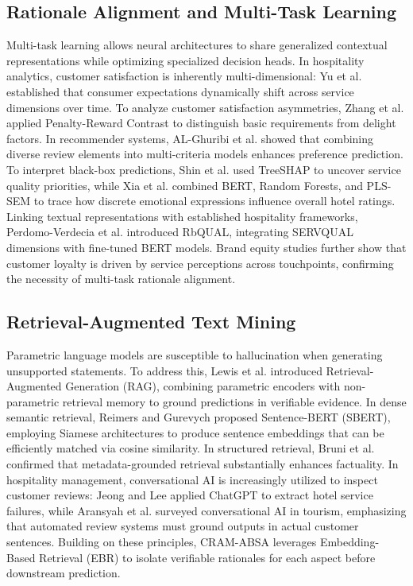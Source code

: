 \documentclass{llncs}
\begin{document}
\subsection{Rationale Alignment and Multi-Task Learning}
\label{subsec:rw_rationale_multitask}
Multi-task learning allows neural architectures to share generalized contextual representations while optimizing specialized decision heads. In hospitality analytics, customer satisfaction is inherently multi-dimensional: Yu et al. \cite{ref06_yu2024} established that consumer expectations dynamically shift across service dimensions over time. To analyze customer satisfaction asymmetries, Zhang et al. \cite{ref13_zhang2022} applied Penalty-Reward Contrast to distinguish basic requirements from delight factors. In recommender systems, AL-Ghuribi et al. \cite{ref27_alghuribi2025} showed that combining diverse review elements into multi-criteria models enhances preference prediction. To interpret black-box predictions, Shin et al. \cite{ref16_shin2024} used TreeSHAP to uncover service quality priorities, while Xia et al. \cite{ref28_xia2026} combined BERT, Random Forests, and PLS-SEM to trace how discrete emotional expressions influence overall hotel ratings. Linking textual representations with established hospitality frameworks, Perdomo-Verdecia et al. \cite{ref17_perdomo2026} introduced RbQUAL, integrating SERVQUAL dimensions with fine-tuned BERT models. Brand equity studies \cite{ref19_tahir2024,ref26_piriyakul2024} further show that customer loyalty is driven by service perceptions across touchpoints, confirming the necessity of multi-task rationale alignment.

\subsection{Retrieval-Augmented Text Mining}
\label{subsec:rw_retrieval_augmented}
Parametric language models are susceptible to hallucination when generating unsupported statements. To address this, Lewis et al. \cite{ref23_lewis2020} introduced Retrieval-Augmented Generation (RAG), combining parametric encoders with non-parametric retrieval memory to ground predictions in verifiable evidence. In dense semantic retrieval, Reimers and Gurevych \cite{ref24_reimers2019} proposed Sentence-BERT (SBERT), employing Siamese architectures to produce sentence embeddings that can be efficiently matched via cosine similarity. In structured retrieval, Bruni et al. \cite{ref02_bruni2025} confirmed that metadata-grounded retrieval substantially enhances factuality. In hospitality management, conversational AI is increasingly utilized to inspect customer reviews: Jeong and Lee \cite{ref14_jeong2024} applied ChatGPT to extract hotel service failures, while Aransyah et al. \cite{ref22_aransyah2026} surveyed conversational AI in tourism, emphasizing that automated review systems must ground outputs in actual customer sentences. Building on these principles, CRAM-ABSA leverages Embedding-Based Retrieval (EBR) to isolate verifiable rationales for each aspect before downstream prediction.
\end{document}
